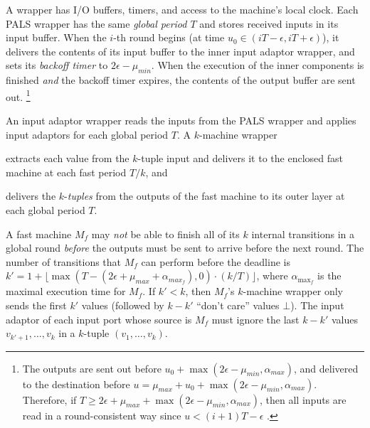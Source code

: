 %
A wrapper has I/O buffers,  timers, and access to the machine's  local clock.
Each PALS wrapper %
has the same \emph{global period $T$} and stores 
received inputs  in its input buffer.
When the $i$-th round begins %
(at time $u_0 \in (iT-\epsilon, iT+\epsilon)$),
it delivers the contents of its input buffer to the inner input adaptor wrapper,
and sets its \emph{backoff timer} to $2\epsilon -\mu_{min}$.
When the execution of the inner components is finished \emph{and}
the backoff timer expires, %
the contents of the output buffer are sent out.%
\footnote{The outputs are sent out before $u_0 + \max(2\epsilon -\mu_{min}, \alpha_{max})$,
and delivered to the destination before $u = \mu_{max} + u_0 +  \max(2\epsilon -\mu_{min}, \alpha_{max})$.
Therefore, if $T\geq 2\epsilon + \mu_{max} + \max(2\epsilon -\mu_{min}, \alpha_{max})$,
then all inputs are read in a round-consistent way since $u < (i+1)T - \epsilon$ \cite{pals-tcs}.}



An input adaptor wrapper reads the inputs from the PALS wrapper
and applies input adaptors %
for each global period $T$. %
A  $k$-machine wrapper
\begin{inparaenum}[(i)]
	\item extracts each value from the $k$-tuple input and delivers it to the enclosed fast machine
at each fast period $T/ k$, and
	\item delivers the $k$-\emph{tuples} from the outputs of the fast machine to its outer layer
	at each global period $T$.
\end{inparaenum}



A fast machine $M_f$ %
may \emph{not} be able to finish 
all of its $k$ internal transitions in a global  round
 \emph{before} the outputs must be sent to arrive before %
the next round.
The number of transitions that $M_f$ can perform before the deadline is 
 $k'= 1+\lfloor \max(T - (2\epsilon + \mu_{max} + \alpha_{max_f}), 0)\cdot (k / T)\rfloor$,
 where  $\alpha_{{\max}_f}$ is the maximal execution time for $M_f$.
If $k' < k$,
then $M_f$'s $k$-machine wrapper only sends the first $k'$ values
(followed by $k - k'$ ``don't care'' values $\bot$).
The input adaptor of each %
input port whose source is $M_f$
must %
ignore the last $k - k'$ values
$v_{k'+1}, \ldots, v_k$ in a $k$-tuple $(v_1, \ldots,  v_k)$.
%


